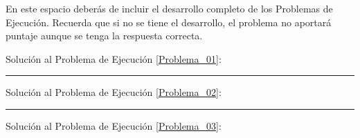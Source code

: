 \documentclass[12pt, letter]{exam}
\begin{document}
\newpage
En este espacio deberás de incluir el desarrollo completo de los Problemas de Ejecución. Recuerda que si no se tiene el desarrollo, el problema no aportará puntaje aunque se tenga la respuesta correcta.

\vspace*{0.5cm}
Solución al Problema de Ejecución \ref{Problema_01}:

\vspace*{6cm}
\rule{0.9\textwidth}{0.3mm}

Solución al Problema de Ejecución \ref{Problema_02}:

\vspace*{6cm}
\rule{0.9\textwidth}{0.3mm}

Solución al Problema de Ejecución \ref{Problema_03}:
\end{document}
